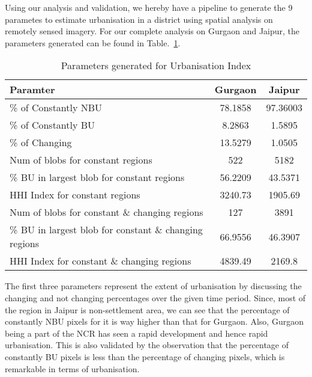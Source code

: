 Using our analysis and validation, we hereby have a pipeline to generate the 9 parametes to estimate urbanisation in a district using spatial analysis on remotely sensed imagery. For our complete analysis on Gurgaon and Jaipur, the parameters generated can be found in Table.~\ref{tab:urbanisation}.

{\renewcommand{\arraystretch}{1.2} %
\begin{table}[htbp]
	\begin{center}
		\begin{tabular}[c]{|l|c|c|} \hline
			{\bf Paramter} 											&  {\bf Gurgaon}	& {\bf Jaipur} 	\\ \hline
			\% of Constantly NBU  									&  78.1858 			& 97.36003 		\\ \hline
			\% of Constantly BU  									&  8.2863			& 1.5895  		\\ \hline
			\% of Changing 											&  13.5279 			& 1.0505		\\ \hline
			Num of blobs for constant regions						&  522 				& 5182 			\\ \hline
			\% BU in largest blob for constant regions  			&  56.2209			& 43.5371 		\\ \hline
			HHI Index for constant regions 							&  3240.73			& 1905.69 		\\ \hline
			Num of blobs for constant \& changing regions  			&  127 				& 3891			\\ \hline
			\% BU in largest blob for constant \& changing regions  &  66.9556 			& 46.3907		\\ \hline
			HHI Index for constant \& changing regions 				&  4839.49 			& 2169.8		\\ \hline
		\end{tabular}
	\end{center}
	\caption{Parameters generated for Urbanisation Index}
	\label{tab:urbanisation}
\end{table} 
}

The first three parameters represent the extent of urbanisation by discussing the changing and not changing percentages over the given time period. Since, most of the region in Jaipur is non-settlement area, we can see that the percentage of constantly NBU pixels for it is way higher than that for Gurgaon. Also, Gurgaon being a part of the NCR has seen a rapid development and hence rapid urbanisation. This is also validated by the observation that the percentage of constantly BU pixels is less than the percentage of changing pixels, which is remarkable in terms of urbanisation.

